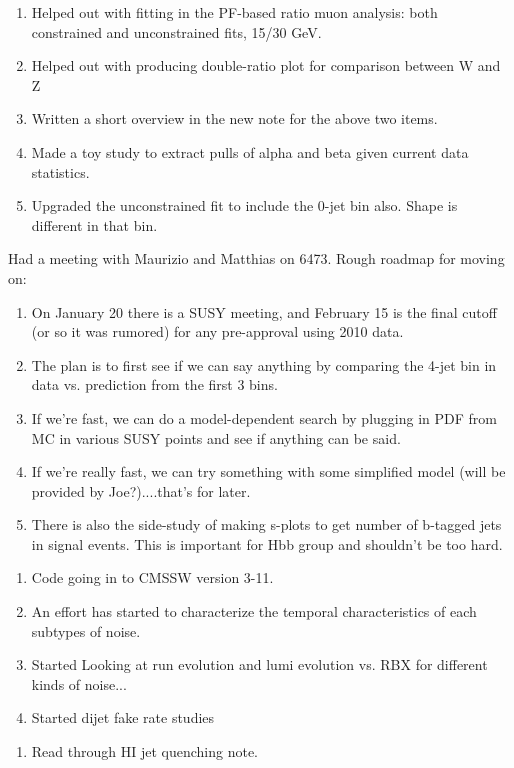 


\begin{enumerate}
\item Helped out with fitting in the PF-based ratio muon analysis: both constrained and unconstrained fits, 15/30 GeV.
\item Helped out with producing double-ratio plot for comparison between W and Z
\item Written a short overview in the new note for the above two items.
\item Made a toy study to extract pulls of alpha and beta given current data statistics.
\item Upgraded the unconstrained fit to include the 0-jet bin also.  Shape is different in that bin.
\end{enumerate}


Had a meeting with Maurizio and Matthias on 6473.  Rough roadmap for moving on:

\begin{enumerate}
\item On January 20 there is a SUSY meeting, and February 15 is the final cutoff (or so it was rumored) for any pre-approval using 2010 data.
\item The plan is to first see if we can say anything by comparing the 4-jet bin in data vs. prediction from the first 3 bins.
\item If we're fast, we can do a model-dependent search by plugging in PDF from MC in various SUSY points and see if anything can be said.
\item If we're really fast, we can try something with some simplified model (will be provided by Joe?)....that's for later.
\item There is also the side-study of making s-plots to get number of b-tagged jets in signal events.  This is important for Hbb group and shouldn't be too hard.
\end{enumerate}


\begin{enumerate}
\item Code going in to CMSSW version 3-11.
\item An effort has started to characterize the temporal characteristics of each subtypes of noise.
\item Started Looking at run evolution and lumi evolution vs. RBX for different kinds of noise...
\item Started dijet fake rate studies
\end{enumerate}


\begin{enumerate}
\item Read through HI jet quenching note.
\end{enumerate}


